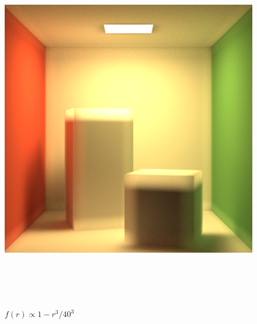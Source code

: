 \documentclass[10pt]{article}
\begin{document}
\begin{figure}[h]
	\centering
	\includegraphics[height=160mm]{one-minus-cubic.png}
	\caption{$f(r) \propto 1-r^3/40^3$}
\end{figure}
\end{document}
